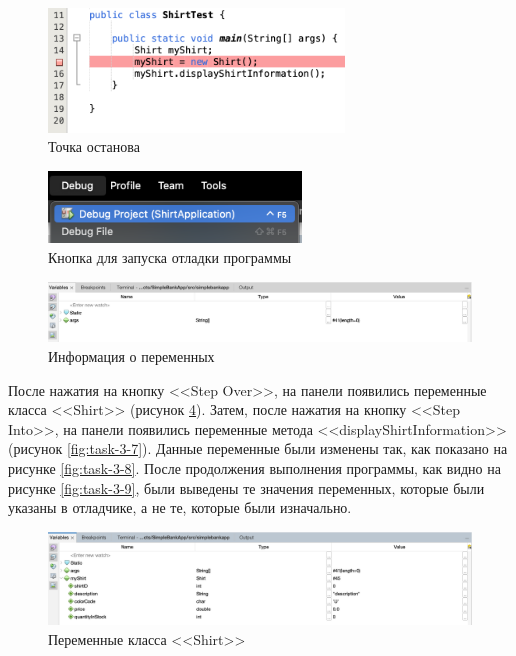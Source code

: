 \documentclass[a4paper, 14pt]{extarticle}
\begin{document}
\begin{figure}[H]
  \centering
  \includegraphics[width=0.7\textwidth]{images/task-3/3.png}
  \caption{Точка останова}
  \label{fig:task-3-3}
\end{figure}

\begin{figure}[H]
  \centering
  \includegraphics[width=0.6\textwidth]{images/task-3/4.png}
  \caption{Кнопка для запуска отладки программы}
  \label{fig:task-3-4}
\end{figure}

\begin{figure}[H]
  \centering
  \includegraphics[width=\textwidth]{images/task-3/5.png}
  \caption{Информация о переменных}
  \label{fig:task-3-5}
\end{figure}

После нажатия на кнопку <<\foreignlanguage{english}{Step Over}>>, на панели
появились переменные класса <<\foreignlanguage{english}{Shirt}>> (рисунок
\ref{fig:task-3-6}). Затем, после нажатия на кнопку
<<\foreignlanguage{english}{Step Into}>>, на панели появились переменные метода
<<\foreignlanguage{english}{displayShirtInformation}>> (рисунок
\ref{fig:task-3-7}). Данные переменные были изменены так, как показано на
рисунке \ref{fig:task-3-8}. После продолжения выполнения программы, как видно на
рисунке \ref{fig:task-3-9}, были выведены те значения переменных, которые были
указаны в отладчике, а не те, которые были изначально.

\begin{figure}[H]
  \centering
  \includegraphics[width=\textwidth]{images/task-3/6.png}
  \caption{Переменные класса <<\foreignlanguage{english}{Shirt}>>}
  \label{fig:task-3-6}
\end{figure}
\end{document}
